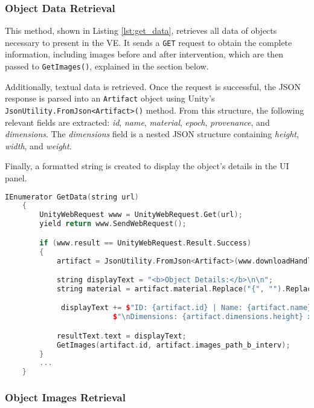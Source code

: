 \subsubsection{Object Data Retrieval}
\label{sec:data_retrieval}
This method, shown in Listing \ref{lst:get_data}, retrieves all data of objects necessary to present in the \gls{VE}.  
It sends a \texttt{GET} request to obtain the complete information, including images before and after intervention, which are then passed to \texttt{GetImages()}, explained in the section below.  

Additionally, textual data is retrieved. Once the request is successful, the JSON response is parsed into an \texttt{Artifact} object using Unity's \texttt{JsonUtility.FromJson<Artifact>()} method.  
From this structure, the following relevant fields are extracted: \emph{id}, \emph{name}, \emph{material}, \emph{epoch}, \emph{provenance}, and \emph{dimensions}.  
The \emph{dimensions} field is a nested JSON structure containing \emph{height}, \emph{width}, and \emph{weight}.  

Finally, a formatted string is created to display the object's details in the \gls{UI} panel.

\newpage
\begin{lstlisting}[language=C++,label={lst:get_data}, caption={Method used to load object data from the database.}]
      IEnumerator GetData(string url)
    {
        UnityWebRequest www = UnityWebRequest.Get(url);
        yield return www.SendWebRequest();

        if (www.result == UnityWebRequest.Result.Success)
        {
            artifact = JsonUtility.FromJson<Artifact>(www.downloadHandler.text);

            string displayText = "<b>Object Details:</b>\n\n";
            string material = artifact.material.Replace("{", "").Replace("}", "");

             displayText += $"ID: {artifact.id} | Name: {artifact.name} \nMaterial: {material} | Epoch: {artifact.epoch} \nProvenance: {artifact.provenance}" +
                         $"\nDimensions: {artifact.dimensions.height} x {artifact.dimensions.width} cm, Weight: {Mathf.Round(artifact.dimensions.weight * 10.0f) * 0.1f} g";

            resultText.text = displayText;
            GetImages(artifact.id, artifact.images_path_b_interv);
        }
        ...
    }
\end{lstlisting}

\subsubsection{Object Images Retrieval}

